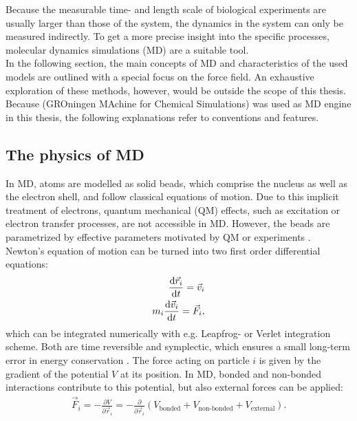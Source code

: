 Because the measurable time- and length scale of biological experiments are usually larger than those of the system, the dynamics in the system can only be measured indirectly. To get a more precise insight into the specific processes, molecular dynamics simulations (MD) are a suitable tool.\\
In the following section, the main concepts of MD and characteristics of the used models are outlined with a special focus on the \martini{} force field. An exhaustive exploration of these methods, however, would be outside the scope of this thesis. Because \gromacs{} (GROningen MAchine for Chemical Simulations) \autocites{gromacs1, gromacsManual} was used as MD engine in this thesis, the following explanations refer to \gromacs{} conventions and features. 
\subsection{The physics of MD}
In MD, atoms are modelled as solid beads, which comprise the nucleus as well as the electron shell, and follow classical equations of motion. Due to this implicit treatment of electrons, quantum mechanical (QM) effects, such as excitation or electron transfer processes, are not accessible in MD. However, the beads are parametrized by effective parameters motivated by QM or experiments \autocite[p. 127-128]{greenBook}.\\
Newton's equation of motion can be turned into two first order differential equations:
\begin{align}
	\label{eq:eq_of_mot_first_order}
	\frac{\text{d} \vec{r}_i}{\text{d} t} = \vec{v}_i \\
	m_i \frac{\text{d} \vec{v}_i}{\text{d} t} = \vec{F}_{i},
\end{align}
which can be integrated numerically with e.g. Leapfrog- or Verlet integration scheme. Both are time reversible and symplectic, which ensures a small long-term error in energy conservation \autocite[p. 72-74]{UnderstandingMD}. The force acting on particle $i$ is given by the gradient of the potential $V$ at its position. In MD, bonded and non-bonded interactions contribute to this potential, but also external forces can be applied:
\begin{align}
	\vec{F}_i = - \frac{\partial V}{\partial \vec{r}_i} = - \frac{\partial}{\partial \vec{r}_i} \left(V_\text{bonded} + V_\text{non-bonded} + V_\text{external}\right).
\end{align}
